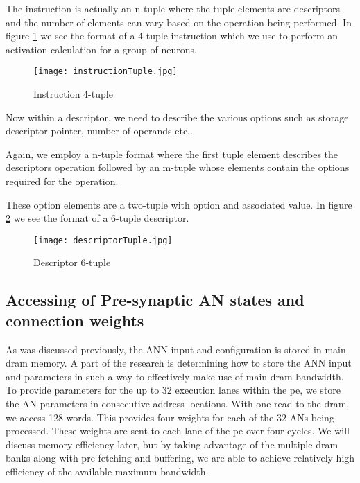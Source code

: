 The instruction is actually an n-tuple where the tuple elements are descriptors and the number of elements can vary based on the operation being performed. In figure \ref{fig:instructionTuple} we see the format of a 4-tuple instruction which we use to perform an activation calculation for a group of neurons.

\begin{figure}[!t]
\centering
\captionsetup{justification=centering}
\captionsetup{width=.9\linewidth}
\centerline{
\mbox{\texttt{[image: instructionTuple.jpg]}}
}
\caption{Instruction 4-tuple}
\label{fig:instructionTuple}
\end{figure}

Now within a descriptor, we need to describe the various options such as storage descriptor pointer, number of operands etc..

Again, we employ a n-tuple format where the first tuple element describes the descriptors operation followed by an m-tuple whose elements contain the options required for the operation.

These option elements are a two-tuple with option and associated value.
In figure \ref{fig:descriptorTuple} we see the format of a 6-tuple descriptor.

\begin{figure}[!t]
\centering
\captionsetup{justification=centering}
\captionsetup{width=.9\linewidth}
\centerline{
\mbox{\texttt{[image: descriptorTuple.jpg]}}
}
\caption{Descriptor 6-tuple}
\label{fig:descriptorTuple}
\end{figure}



\subsection{Accessing of Pre-synaptic AN states and connection weights}
\label{ssec:AccessingANStates}

As was discussed previously, the ANN input and configuration is stored in main \ac{dram} memory. A part of the research is determining how to store the ANN input and parameters in such a way to effectively make use of main \ac{dram} bandwidth. To provide parameters for the up to 32 execution lanes within the \ac{pe}, we store the AN parameters in consecutive address locations. With one read to the \ac{dram}, we access 128 words. This provides four weights for each of the 32 ANs being processed. These weights are sent to each lane of the \ac{pe} over four cycles. We will discuss memory efficiency later, but by taking advantage of the multiple \ac{dram} banks along with pre-fetching and buffering, we are able to achieve relatively high efficiency of the available maximum bandwidth.

